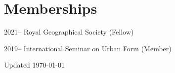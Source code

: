 \documentclass[11pt,a4paper]{report}
\begin{document}


    \section*{Memberships}

    \begin{tablist}

        \item[2021--] \tab{}Royal Geographical Society (Fellow)
        \item[2019--] \tab{}International Seminar on Urban Form (Member)

    \end{tablist}

    \begin{center}
        \vfill
        Updated \monthyeardate\today
    \end{center}
\end{document}
